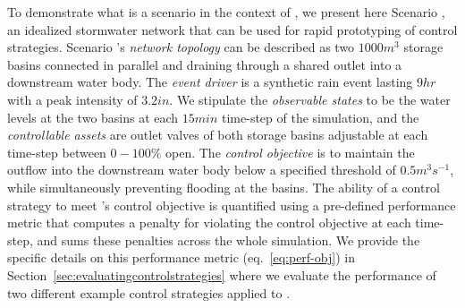 To demonstrate what is a scenario in the context of \pystormsNOSPACE, we present here Scenario , an idealized stormwater network that can be used for rapid prototyping of control strategies. Scenario 's \emph{network topology} can be described as two $1000 \unit{m^3}$ storage basins connected in parallel and draining through a shared outlet into a downstream water body. The \emph{event driver} is a synthetic rain event lasting $9 \unit{hr}$ with a peak intensity of $3.2 \unit{in}$. We stipulate the \emph{observable states} to be the water levels at the two basins at each $15 \unit{min}$ time-step of the simulation, and the \emph{controllable assets} are outlet valves of both storage basins adjustable at each time-step between $0-100\unit{\%}$ open. The \emph{control objective} is to maintain the outflow into the downstream water body below a specified threshold of $0.5 \unit{m^3s^{-1}}$, while simultaneously preventing flooding at the basins. The ability of a control strategy to meet 's control objective is quantified using a pre-defined performance metric that computes a penalty for violating the control objective at each time-step, and sums these penalties across the whole simulation. We provide the specific details on this performance metric (eq.~\ref{eq:perf-obj}) in Section~\ref{sec:evaluatingcontrolstrategies} where we evaluate the performance of two different example control strategies applied to .
%
%
%
